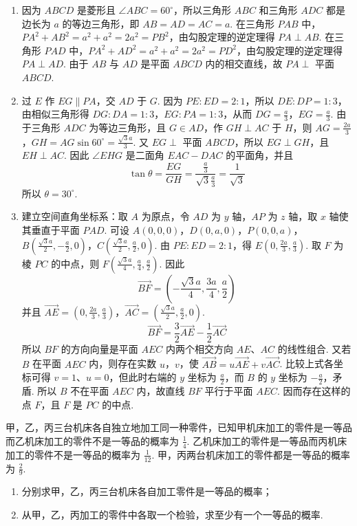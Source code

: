 \begin{solution}
\begin{enumerate}
\item 因为 \(ABCD\) 是菱形且 \(\angle ABC=60^\circ\)，所以三角形 \(ABC\) 和三角形 \(ADC\) 都是边长为 \(a\) 的等边三角形，即 \(AB=AD=AC=a\). 在三角形 \(PAB\) 中，\(PA^2+AB^2=a^2+a^2=2a^2=PB^2\)，由勾股定理的逆定理得 \(PA\perp AB\). 在三角形 \(PAD\) 中，\(PA^2+AD^2=a^2+a^2=2a^2=PD^2\)，由勾股定理的逆定理得 \(PA\perp AD\). 由于 \(AB\) 与 \(AD\) 是平面 \(ABCD\) 内的相交直线，故 \(PA\perp\) 平面 \(ABCD\).
\item 过 \(E\) 作 \(EG\parallel PA\)，交 \(AD\) 于 \(G\). 因为 \(PE:ED=2:1\)，所以 \(DE:DP=1:3\)，由相似三角形得 \(DG:DA=1:3\)，\(EG:PA=1:3\)，从而 \(DG=\frac{a}{3}\)，\(EG=\frac{a}{3}\). 由于三角形 \(ADC\) 为等边三角形，且 \(G\in AD\)，作 \(GH\perp AC\) 于 \(H\)，则 \(AG=\frac{2a}{3}\)，\(GH=AG\sin60^\circ=\frac{\sqrt{3}a}{3}\). 又 \(EG\perp\) 平面 \(ABCD\)，所以 \(EG\perp GH\)，且 \(EH\perp AC\). 因此 \(\angle EHG\) 是二面角 \(EAC-DAC\) 的平面角，并且
\[
\tan\theta=\frac{EG}{GH}=\frac{\frac{a}{3}}{\sqrt{3}\frac{a}{3}}=\frac{1}{\sqrt{3}}
\]
所以 \(\theta=30^\circ\).
\item 建立空间直角坐标系：取 \(A\) 为原点，令 \(AD\) 为 \(y\) 轴，\(AP\) 为 \(z\) 轴，取 \(x\) 轴使其垂直于平面 \(PAD\). 可设 \(A(0,0,0)\)，\(D(0,a,0)\)，\(P(0,0,a)\)，\(B\left(\frac{\sqrt{3}a}{2},-\frac{a}{2},0\right)\)，\(C\left(\frac{\sqrt{3}a}{2},\frac{a}{2},0\right)\). 由 \(PE:ED=2:1\)，得 \(E\left(0,\frac{2a}{3},\frac{a}{3}\right)\). 取 \(F\) 为棱 \(PC\) 的中点，则 \(F\left(\frac{\sqrt{3}a}{4},\frac{a}{4},\frac{a}{2}\right)\). 因此
\[
\overrightarrow{BF}=\left(-\frac{\sqrt{3}a}{4},\frac{3a}{4},\frac{a}{2}\right)
\]
并且 \(\overrightarrow{AE}=\left(0,\frac{2a}{3},\frac{a}{3}\right)\)，\(\overrightarrow{AC}=\left(\frac{\sqrt{3}a}{2},\frac{a}{2},0\right)\).
\[
\overrightarrow{BF}=\frac{3}{2}\overrightarrow{AE}-\frac{1}{2}\overrightarrow{AC}
\]
所以 \(BF\) 的方向向量是平面 \(AEC\) 内两个相交方向 \(AE\)、\(AC\) 的线性组合. 又若 \(B\) 在平面 \(AEC\) 内，则存在实数 \(u\)，\(v\)，使 \(\overrightarrow{AB}=u\overrightarrow{AE}+v\overrightarrow{AC}\). 比较上式各坐标可得 \(v=1\)、\(u=0\)，但此时右端的 \(y\) 坐标为 \(\frac{a}{2}\)，而 \(B\) 的 \(y\) 坐标为 \(-\frac{a}{2}\)，矛盾. 所以 \(B\) 不在平面 \(AEC\) 内，故直线 \(BF\) 平行于平面 \(AEC\). 因而存在这样的点 \(F\)，且 \(F\) 是 \(PC\) 的中点.
\end{enumerate}
\end{solution}

\begin{problem}
甲，乙，丙三台机床各自独立地加工同一种零件，已知甲机床加工的零件是一等品而乙机床加工的零件不是一等品的概率为 \(\frac{1}{4}\). 乙机床加工的零件是一等品而丙机床加工的零件不是一等品的概率为 \(\frac{1}{12}\). 甲，丙两台机床加工的零件都是一等品的概率为 \(\frac{2}{9}\).

\begin{enumerate}
\item 分别求甲，乙，丙三台机床各自加工零件是一等品的概率；
\item 从甲，乙，丙加工的零件中各取一个检验，求至少有一个一等品的概率.
\end{enumerate}
\end{problem}

